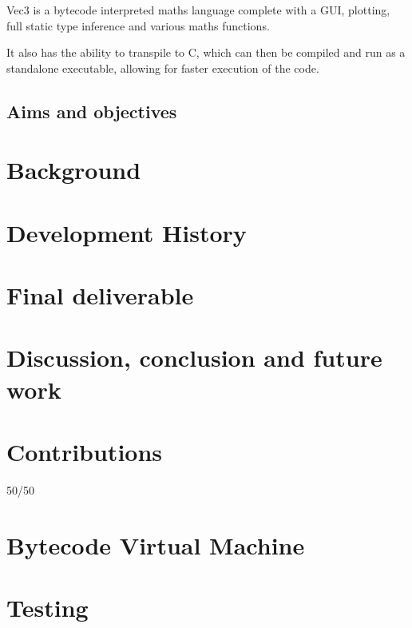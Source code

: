 \documentclass[a4paper, oneside, 11pt]{report}
\begin{document}
Vec3 is a bytecode interpreted maths language complete with a GUI, plotting, full static type inference and various
maths functions.

It also has the ability to transpile to C, which can then be compiled and run as a standalone executable, allowing for
faster execution of the code.

\section{Aims and objectives}\label{sec:aims-and-objectives}

\chapter{Background}\label{ch:background}

\chapter{Development History}\label{ch:devhist}



\chapter{Final deliverable}\label{ch:impl}



\chapter{Discussion, conclusion and future work}\label{ch:discussion-conclusion-and-future-work}





\appendix
\chapter{Contributions}\label{ch:contributions}

50/50

\chapter{Bytecode Virtual Machine}\label{sec:compiler}

\chapter{Testing}\label{ch:test}
\end{document}
